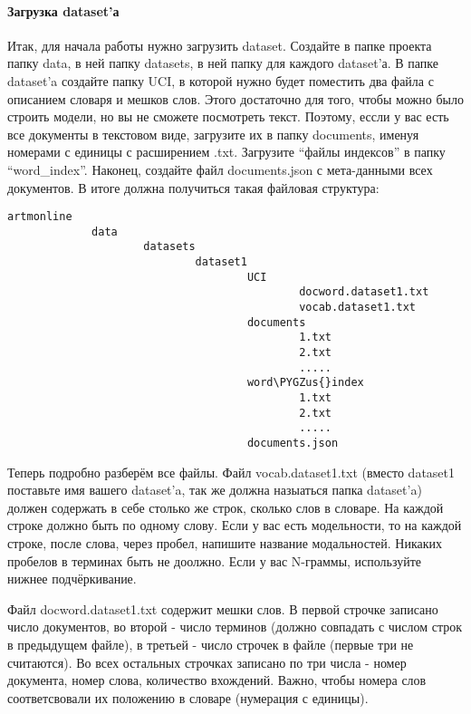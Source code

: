 \documentclass[letterpaper,10pt,english]{sphinxmanual}
\def\PYGZus{\char`\_}
\begin{document}
\paragraph{Загрузка dataset'а}

Итак, для начала работы нужно загрузить dataset. Создайте в папке проекта папку data, в ней папку datasets, в ней папку для каждого dataset'а.
В папке dataset'a создайте папку UCI, в которой нужно будет поместить два файла с описанием словаря и мешков слов. Этого достаточно для того, чтобы
можно было строить модели, но вы не сможете посмотреть текст. Поэтому, ессли у вас есть все документы в текстовом виде, загрузите их в папку
documents, именуя номерами с единицы с расширением .txt. Загрузите ``файлы индексов'' в папку ``word\_index''. Наконец, создайте файл documents.json
с мета-данными всех документов. В итоге должна получиться такая файловая структура:

\begin{Verbatim}[commandchars=\\\{\}]
artmonline
             data
                     datasets
                             dataset1
                                     UCI
                                             docword.dataset1.txt
                                             vocab.dataset1.txt
                                     documents
                                             1.txt
                                             2.txt
                                             .....
                                     word\PYGZus{}index
                                             1.txt
                                             2.txt
                                             .....
                                     documents.json
\end{Verbatim}

Теперь подробно разберём все файлы. Файл vocab.dataset1.txt (вместо dataset1 поставьте имя вашего dataset'a, так же должна назыаться папка dataset'a)
должен содержать в себе столько же строк, сколько слов в словаре. На каждой строке должно быть по одному слову. Если у вас есть модельности,
то на каждой строке, после слова, через пробел, напишите название модальностей. Никаких пробелов в терминах быть не доолжно. Если у вас N-граммы,
используйте нижнее подчёркивание.

Файл docword.dataset1.txt содержит мешки слов. В первой строчке записано число документов,
во второй - число терминов (должно совпадать с числом строк в предыдущем файле), в третьей - число строчек в файле (первые три не считаются).
Во всех остальных строчках записано по три числа - номер документа, номер слова, количество вхождений. Важно, чтобы номера слов соответсвовали
их положению в словаре (нумерация с единицы).
\end{document}
